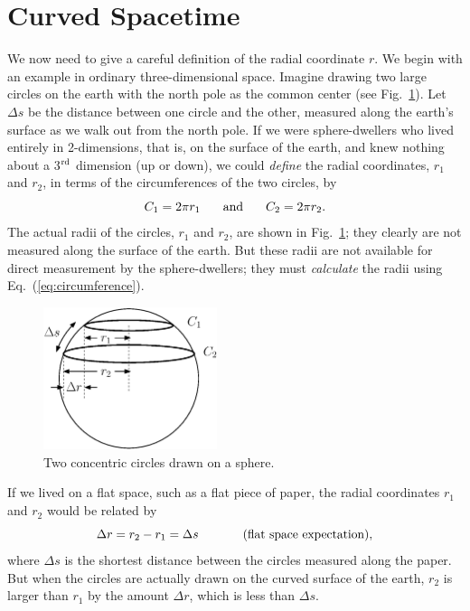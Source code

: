 \section{Curved Spacetime}
     
We now need to give a careful definition of the radial coordinate $r$.
We begin with an example in ordinary three-dimensional space.  Imagine
drawing two large circles on the earth with the north pole as the
common center (see Fig.~\ref{fig:sphere}).  Let $\Delta s$ be the distance
between one circle and the other, measured along the earth's surface
as we walk out from the north pole.  If we were sphere-dwellers who
lived entirely in 2-dimensions, that is, on the surface of the earth,
and knew nothing about a 3$^{\rm rd}$ dimension (up or down), we could
{\em define} the radial
coordinates, $r_1$ and $r_2$, in terms of the circumferences of the
two circles, by
\begin{equation}
C_1 = 2\pi r_1\mbox{\hspace{.25in}and\hspace{.25in}}C_2 = 2\pi r_2.
\label{eq:circumference}
\end{equation}
The actual radii of the circles, $r_1$ and $r_2$, are shown in
Fig.~\ref{fig:sphere}; they clearly are not measured along the surface
of the earth.  But these radii are not available for direct
measurement by the sphere-dwellers; they must \textit{calculate} the
radii using Eq.~(\ref{eq:circumference}).
     
\begin{figure}[tbp]
\begin{center}
\includegraphics[width=2in]{gravity_and_geometry/sphere.eps}
\end{center}
\caption{Two concentric circles drawn on a sphere.}
\label{fig:sphere}
\end{figure}
     
If we lived on a flat space, such as a flat piece of paper, the radial
coordinates $r_1$ and $r_2$ would be related by
\begin{equation}
\Delta r = r_2 - r_1 = \Delta s \mbox{\hspace{0.5in}(flat space
  expectation)},
\label{eq:flat}
\end{equation}
where $\Delta s$ is the shortest distance between the circles measured
along the paper.  But when the circles are actually drawn on the
curved surface of the earth, $r_2$ is larger than $r_1$ by the amount
$\Delta r$, which is less than $\Delta s$.
     
